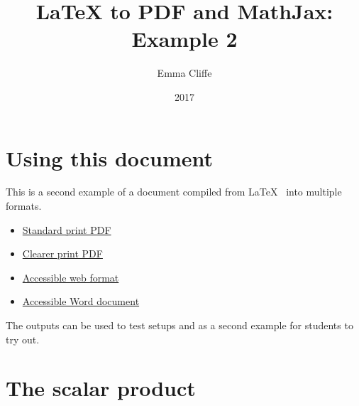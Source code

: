 \documentclass[12pt,a4paper]{article}
\title{LaTeX to PDF and MathJax: Example 2}
\author{Emma Cliffe}
\date{2017}
\theoremstyle{clearprint}
\begin{document}
\maketitle

\tableofcontents
\listoffigures
\newpage

\setcounter{page}{1}

\section*{Using this document}

This is a second example of a document compiled from \LaTeX~ into multiple formats. 
\begin{itemize} 
\item \href{https://stem-enable.github.io/LaTeXtoPDFandMathJax-Example2/LaTeXtoPDFandMathJax-2-standard.pdf}{Standard print PDF}
\item \href{https://stem-enable.github.io/LaTeXtoPDFandMathJax-Example2/LaTeXtoPDFandMathJax-2-clear.pdf}{Clearer print PDF}
\item \href{https://stem-enable.github.io/LaTeXtoPDFandMathJax-Example2/}{Accessible web format}
\item \href{https://stem-enable.github.io/LaTeXtoPDFandMathJax-Example2/LaTeXtoPDFandMathJax-2.docx}{Accessible Word document}
\end{itemize}

The outputs can be used to test setups and as a second example for students to try out. 

\newpage
\section{The scalar product}
\end{document}
